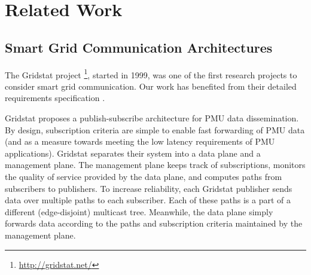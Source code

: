 

\section{Related Work}
\label{sec:related}

\subsection{Smart Grid Communication Architectures}


The Gridstat project \footnote{\url{http://gridstat.net/}}, started in 1999, was one of the first research projects to consider smart grid communication.  
Our work has benefited from their %
detailed requirements specification \cite{Bakken11}.

Gridstat proposes a publish-subscribe architecture for PMU data dissemination. By design, subscription criteria are simple to enable fast forwarding of PMU data
(and as a measure towards meeting the low latency requirements of PMU applications).  
Gridstat separates their system into a data plane and a management plane. The management plane keeps track of subscriptions,
monitors the quality of service provided by the data plane, and computes paths from subscribers to publishers.  To increase reliability, each Gridstat publisher sends data over multiple paths
to each subscriber. Each of these paths is a part of a different (edge-disjoint) multicast tree.  Meanwhile, the data plane simply forwards data according to the paths and subscription 
criteria maintained by the management plane.  

